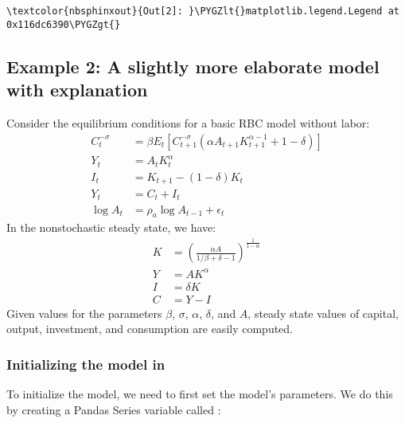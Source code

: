 \documentclass[letterpaper,10pt,openany,oneside,english]{sphinxmanual}
\begin{document}
\begin{Verbatim}[commandchars=\\\{\}]
\textcolor{nbsphinxout}{Out[2]: }\PYGZlt{}matplotlib.legend.Legend at 0x116dc6390\PYGZgt{}
\end{Verbatim}

\noindent{}


\subsection{Example 2: A slightly more elaborate model with explanation}
\label{\detokenize{examples:Example-2:-A-slightly-more-elaborate-model-with-explanation}}
Consider the equilibrium conditions for a basic RBC model without labor:
\label{\detokenize{examples:equation-examples:4}}\label{equation:examples:examples:4}\begin{align}
C_t^{-\sigma} & = \beta E_t \left[C_{t+1}^{-\sigma}(\alpha A_{t+1} K_{t+1}^{\alpha-1} + 1 - \delta)\right]\\
Y_t & = A_t K_t^{\alpha}\\
I_t & = K_{t+1} - (1-\delta)K_t\\
Y_t & = C_t + I_t\\
\log A_t & = \rho_a \log A_{t-1} + \epsilon_t
\end{align}
In the nonstochastic steady state, we have:
\label{\detokenize{examples:equation-examples:5}}\label{equation:examples:examples:5}\begin{align}
K & = \left(\frac{\alpha A}{1/\beta+\delta-1}\right)^{\frac{1}{1-\alpha}}\\
Y & = AK^{\alpha}\\
I & = \delta K\\
C & = Y - I
\end{align}
Given values for the parameters \(\beta\), \(\sigma\),
\(\alpha\), \(\delta\), and \(A\), steady state values of
capital, output, investment, and consumption are easily computed.


\subsubsection{Initializing the model in }
\label{\detokenize{examples:Initializing-the-model-in-linearsolve}}
To initialize the model, we need to first set the model's parameters. We
do this by creating a Pandas Series variable called :
\end{document}
